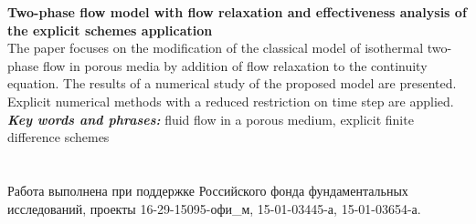 {\bf Two-phase flow model with flow relaxation
and effectiveness analysis of the explicit schemes application} \\


The paper focuses on the modification of the classical model of isothermal two-phase 
flow in porous media by addition of flow relaxation to the continuity equation. 
The results of a numerical study of the proposed model are presented. 
Explicit numerical methods with a reduced restriction on time step are applied. \\


{\textit{ \textbf {Key words and phrases:}}} fluid flow in a porous medium, explicit finite difference schemes \\ \\ \\


Работа выполнена при поддержке Российского фонда фундаментальных исследований, проекты 16-29-15095-офи\_м, 15-01-03445-а, 15-01-03654-а. \\ \\ \\